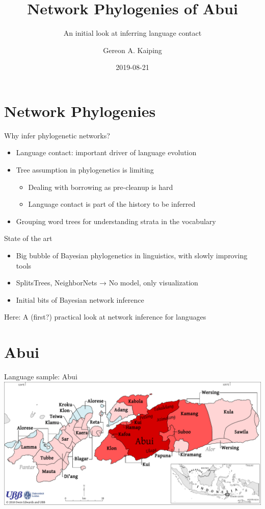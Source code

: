 \documentclass[
10pt,
]{beamer}
\title{Network Phylogenies of Abui}
\subtitle{An initial look at inferring language contact}
\author{Gereon A. Kaiping}
\institute{Leiden University Centre for Linguistics, Niederlande}
\date{2019-08-21}
\begin{document}
\begin{frame}[plain]
  \titlepage
\end{frame}
\begin{frame}
  \tableofcontents
\end{frame}
\section{Network Phylogenies}
\begin{frame}{Why infer phylogenetic networks?}
  \begin{itemize}
  \item Language contact: important driver of language evolution
  \item Tree assumption in phylogenetics is limiting
    \begin{itemize}
    \item Dealing with borrowing as pre-cleanup is hard
    \item Language contact is part of the history to be inferred
    \end{itemize}
  \item Grouping word trees for understanding strata in the vocabulary
  \end{itemize}
\end{frame}
\begin{frame}{State of the art}
  \begin{itemize}
  \item Big bubble of Bayesian phylogenetics in linguistics, with slowly improving tools
  \item SplitsTrees, NeighborNets → No model, only visualization
  \item Initial bits of Bayesian network inference
  \end{itemize}
  Here: A (first?) practical look at network inference for languages
\end{frame}
\section{Abui}
\begin{frame}{Language sample: Abui}
  \includegraphics[width=\textwidth]{Abui_Neighbors}
\end{frame}
\end{document}
